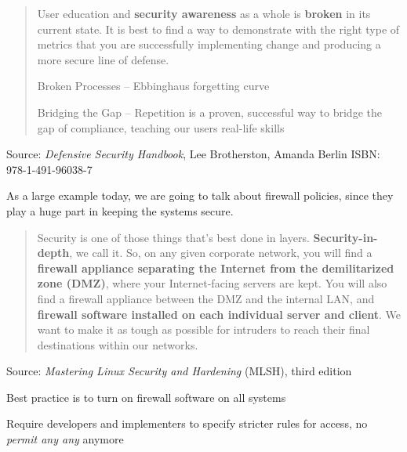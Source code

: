 \documentclass[Screen16to9,17pt]{foils}
\begin{document}


\begin{quote}
User education and {\bf security awareness} as a whole is {\bf broken} in its current state. It is best to find a way to demonstrate with the right type of metrics that you are successfully implementing change and producing a more secure line of defense.
\begin{list2}
\item Broken Processes -- Ebbinghaus forgetting curve
\item Bridging the Gap -- Repetition is a proven, successful way to bridge the gap of compliance, teaching our users real-life skills
\end{list2}
\end{quote}
Source: \emph{Defensive Security Handbook}, Lee Brotherston, Amanda Berlin ISBN: 978-1-491-96038-7






As a large example today, we are going to talk about firewall policies, since they play a huge part in keeping the systems secure.
\begin{quote}
Security is one of those things that’s best done in layers. {\bf Security-in-depth}, we call it. So, on any given
corporate network, you will find a {\bf firewall appliance separating the Internet from the demilitarized
zone (DMZ)}, where your Internet-facing servers are kept. You will also find a firewall appliance between
the DMZ and the internal LAN, and {\bf firewall software installed on each individual server and client}. We
want to make it as tough as possible for intruders to reach their final destinations within our networks.
\end{quote}
Source: \emph{Mastering Linux Security and Hardening} (MLSH), third edition


\begin{list2}
\item Best practice is to turn on firewall software on all systems
\item Require developers and implementers to specify stricter rules for access, no \emph{permit any any} anymore
\end{list2}


\end{document}
